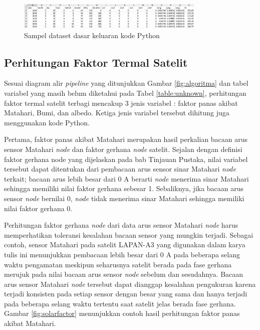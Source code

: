 \begin{figure}[H]
\setlength{}
\begin{center}
\includegraphics[width=0.8\textwidth]{fig/basedataset.png}
\caption{Sampel dataset dasar keluaran kode Python}
\label{fig:basedataset}
\end{center}
\end{figure}

\subsection{Perhitungan Faktor Termal Satelit}

Sesuai diagram alir \textit{pipeline} yang ditunjukkan Gambar
\ref{fig:algoritma} dan tabel variabel yang masih belum diketahui pada Tabel
\ref{table:unknown}, perhitungan faktor termal satelit terbagi mencakup 3 jenis
variabel : faktor panas akibat Matahari, Bumi, dan albedo. Ketiga jenis
variabel tersebut dihitung juga menggunakan kode Python. 

Pertama, faktor panas akibat Matahari merupakan hasil perkalian bacaan arus
sensor Matahari \textit{node} dan faktor gerhana \textit{node} satelit. Sejalan
dengan definisi faktor gerhana node yang dijelaskan pada bab Tinjauan Pustaka,
nilai variabel tersebut dapat ditentukan dari pembacaan arus sensor sinar
Matahari \textit{node} terkait; bacaan arus lebih besar dari 0 A berarti
\textit{node} menerima sinar Matahari sehingga memiliki nilai faktor gerhana
sebesar 1. Sebaliknya, jika bacaan arus sensor \textit{node} bernilai 0,
\textit{node} tidak menerima sinar Matahari sehingga memiliki nilai faktor
gerhana 0.

Perhitungan faktor gerhana \textit{node} dari data arus sensor Matahari
\textit{node} harus memperhatikan toleransi kesalahan bacaan sensor yang
mungkin terjadi. Sebagai contoh, sensor Matahari pada satelit LAPAN-A3 yang
digunakan dalam karya tulis ini menunjukkan pembacaan lebih besar dari 0 A pada
beberapa selang waktu pengamatan meskipun seharusnya satelit berada pada fase
gerhana merujuk pada nilai bacaan arus sensor \textit{node} sebelum dan
sesudahnya. Bacaan arus sensor Matahari \textit{node} tersebut dapat dianggap
kesalahan pengukuran karena terjadi konsisten pada setiap sensor dengan besar
yang sama dan hanya terjadi pada beberapa selang waktu tertentu saat satelit
jelas berada fase gerhana. Gambar \ref{fig:solarfactor} menunjukkan contoh hasil perhitungan faktor panas akibat Matahari. 

